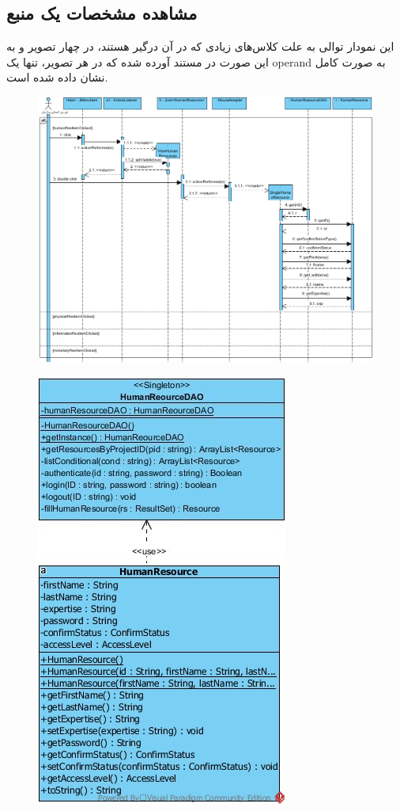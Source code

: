 \begin{landscape}
\newpage
\section{مشاهده مشخصات یک منبع}
این نمودار توالی به علت کلاس‌های زیادی که در آن درگیر هستند، در چهار تصویر و به این صورت در مستند آورده شده که در هر تصویر، تنها یک operand به صورت کامل نشان داده شده است.
\newpage
\begin{figure}[H]
	\centering
	\includegraphics[scale=0.8]{img/sequence-design/ViewResourceAttributes_HUMAN}
\end{figure}
\begin{figure}[H]
	\centering
	\includegraphics[scale=0.6]{img/sequence-design/ViewResourceAttributes_HUMANC}

\end{figure}
\end{landscape}
